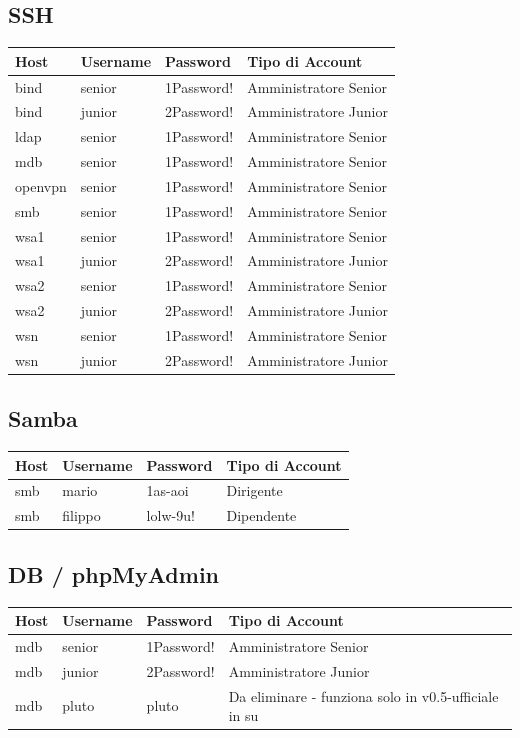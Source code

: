 \documentclass[a4paper,12pt]{article}
\begin{document}
\subsection*{SSH}
\begin{longtable}{lll l}
\toprule
Host & Username & Password & Tipo di Account \\
\midrule
bind & senior & 1Password! & Amministratore Senior \\
bind & junior & 2Password! & Amministratore Junior \\
ldap & senior & 1Password! & Amministratore Senior \\
mdb & senior & 1Password! & Amministratore Senior \\
openvpn & senior & 1Password! & Amministratore Senior \\
smb & senior & 1Password! & Amministratore Senior \\
wsa1 & senior & 1Password! & Amministratore Senior \\
wsa1 & junior & 2Password! & Amministratore Junior \\
wsa2 & senior & 1Password! & Amministratore Senior \\
wsa2 & junior & 2Password! & Amministratore Junior \\
wsn & senior & 1Password! & Amministratore Senior \\
wsn & junior & 2Password! & Amministratore Junior \\
\bottomrule
\end{longtable}

\subsection*{Samba}
\begin{longtable}{lll l}
\toprule
Host & Username & Password & Tipo di Account \\
\midrule
smb & mario & 1as-aoi & Dirigente \\
smb & filippo & lolw-9u! & Dipendente \\
\bottomrule
\end{longtable}

\subsection*{DB / phpMyAdmin}
\begin{longtable}{lll l}
\toprule
Host & Username & Password & Tipo di Account \\
\midrule
mdb & senior & 1Password! & Amministratore Senior \\
mdb & junior & 2Password! & Amministratore Junior \\
mdb & pluto & pluto & Da eliminare - funziona solo in v0.5-ufficiale in su \\
\bottomrule
\end{longtable}
\end{document}
